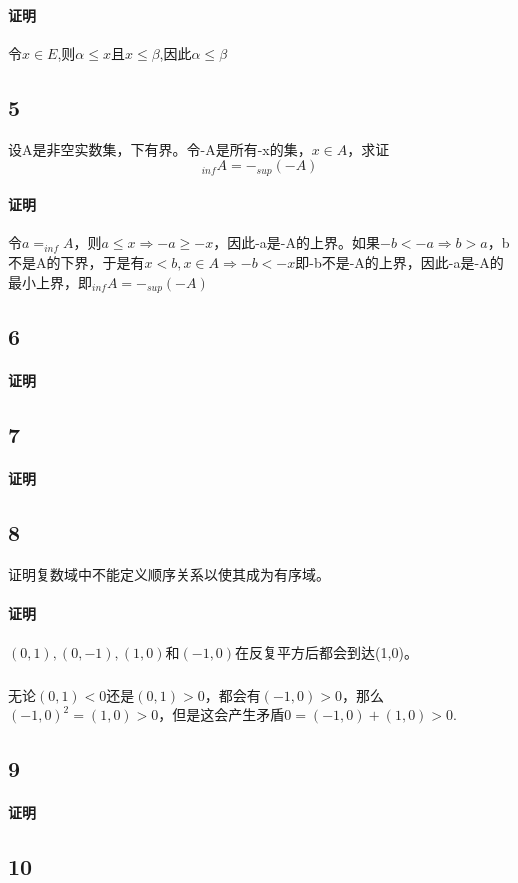\paragraph{证明}令$x \in E$,则$ \alpha \le x $且$x \le \beta$,因此$\alpha \le \beta$
\subsection*{5} 设A是非空实数集，下有界。令-A是所有-x的集，$x\in A$，求证$$_{inf}A=-_{sup}(-A)$$
\paragraph{证明} 令$a=_{inf}A$，则$a\le x \Rightarrow -a \ge -x$，因此-a是-A的上界。如果$-b < -a \Rightarrow b > a $，b不是A的下界，于是有$x < b, x\in A \Rightarrow -b < -x $即-b不是-A的上界，因此-a是-A的最小上界，即$_{inf}A=-_{sup}(-A)$
\subsection*{6}
\paragraph{证明}
\subsection*{7}
\paragraph{证明}
\subsection*{8} 证明复数域中不能定义顺序关系以使其成为有序域。
\paragraph{证明}$(0,1),(0, -1),(1, 0)和(-1, 0)$在反复平方后都会到达(1,0)。
\subparagraph{}无论$(0, 1) < 0$还是$(0, 1) > 0$，都会有$(-1, 0) > 0$，那么$(-1, 0)^2=(1, 0) > 0$，但是这会产生矛盾$ 0 = (-1, 0) + (1, 0) > 0$.
\subsection*{9}
\paragraph{证明}
\subsection*{10}
